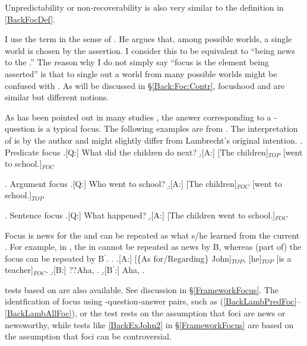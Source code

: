 Unpredictability or non-recoverability \cite[see also][]{kuno72} is also very similar to the definition in \ref{BackFocDef}.

I use the term  in the sense of .
He argues that, among possible worlds, a single world is chosen by the assertion.
I consider this to be equivalent to ``being news to the .''
The reason why I do not simply say ``focus is the element being asserted'' is that
to single out a world from many possible worlds might be confused with .
As will be discussed in \S \ref{Back:Foc:Contr},
focushood and  are similar but different notions.

As has been pointed out in many studies \cite[e.g.,][]{matsushita28,chomsky65,gundel74},
the answer corresponding to a -question is a typical focus.
The following examples are from .
The interpretation of  is by the author
and might slightly differ from Lambrecht's original intention.
%
\ex. \label{BackLambPredFoc}{Predicate focus}
	\a.[Q:] What did the children do next?
	\b.[A:] {[The children]$_{TOP}$ [went to school.]$_{FOC}$}

\ex. \label{BackLambArgFoc}{Argument focus}
	\a.[Q:] Who went to school?
	\b.[A:] {[The children]$_{FOC}$ [went to school.]$_{TOP}$}

\ex. \label{BackLambAllFoc}{Sentence focus}
	\a.[Q:] What happened?
	\b.[A:] {[The children went to school.]$_{FOC}$}


Focus is news \cite[or newsworthy in][]{mithun95} for the  and can be repeated as what s/he learned from the current .
For example, in \Next,
the   in \Next[A] cannot be repeated as news by B,
whereas (part of) the focus  can be repeated by B$^{\prime}$.
%
\ex. \a.[A:] [\{As for/Regarding\} John]$_{TOP}$, [he]$_{TOP}$ [is a teacher]$_{FOC}$.
     \b.[B:] ??Aha, .
     \b.[B$^{\prime}$:] Aha, .

 tests based on  are also available.
See discussion in \S \ref{FrameworkFocus}.
The identfication of focus using
-question-answer pairs, such as (\ref{BackLambPredFoc}--\ref{BackLambAllFoc}), or the  test \Last
rests on the assumption that
foci are news or newsworthy,
while  tests like \ref{BackExJohn2} in \S \ref{FrameworkFocus} are based on the assumption that
foci can be controversial.


